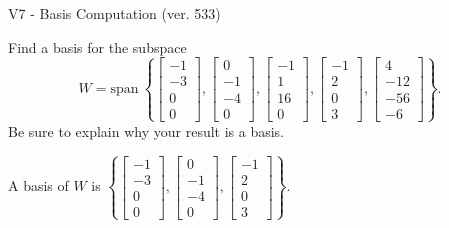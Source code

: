\begin{exercise}
  \begin{exerciseTitle}V7 - Basis Computation (ver. 533)\end{exerciseTitle}
  \begin{exerciseStatement}
    Find a basis for the subspace 
\[W=\mathrm{span}\ \left\{\left[\begin{array}{r}
-1 \\
-3 \\
0 \\
0
\end{array}\right] , \left[\begin{array}{r}
0 \\
-1 \\
-4 \\
0
\end{array}\right] , \left[\begin{array}{r}
-1 \\
1 \\
16 \\
0
\end{array}\right] , \left[\begin{array}{r}
-1 \\
2 \\
0 \\
3
\end{array}\right] , \left[\begin{array}{r}
4 \\
-12 \\
-56 \\
-6
\end{array}\right]\right\}.\]
 Be sure to explain why your result is a basis.


  \end{exerciseStatement}
  \begin{exerciseAnswer}
   A basis of \(W\) is  \(\left\{\left[\begin{array}{r}
-1 \\
-3 \\
0 \\
0
\end{array}\right] , \left[\begin{array}{r}
0 \\
-1 \\
-4 \\
0
\end{array}\right] , \left[\begin{array}{r}
-1 \\
2 \\
0 \\
3
\end{array}\right]\right\}\).
  


  \end{exerciseAnswer}
\end{exercise}